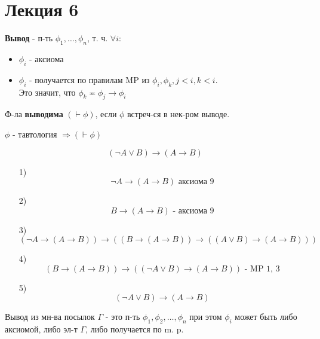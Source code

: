 \section{Лекция 6}
\begin{definition}
\textbf{Вывод} - п-ть $\phi_1, \ldots, \phi_n$, т. ч. $\forall i\colon$
\begin{itemize}
  \item $\phi_i$ - аксиома
  \item $\phi_i$ - получается по правилам MP из $\phi_i, \phi_k, j < i, k < i$. \\
    Это значит, что $\phi_k \eqcirc \phi_j \rightarrow \phi_i$
\end{itemize}
Ф-ла \textbf{выводима} $(\vdash \phi)$, если $\phi$ встреч-ся в нек-ром выводе.
\end{definition}
\begin{theorem}
$\phi$ - тавтология $ \Rightarrow (\vdash \phi)$ 
\end{theorem}
\begin{example}
\[
  (\neg A \lor B) \rightarrow (A \rightarrow B)
\]
\begin{itemize}
  \item [1)] \[
  \neg A \rightarrow (A \rightarrow B) \text{ аксиома 9}
  \]
\item [2) ] \[
  B \rightarrow (A \rightarrow B) \text{ - аксиома 9}
\]
\item [3) ] \[
  (\neg A \rightarrow (A \rightarrow B)) \rightarrow ((B \rightarrow (A \rightarrow B)) \rightarrow ((A \lor B) \rightarrow (A \rightarrow B)))
\]
\item [4) ] \[
  (B \rightarrow (A \rightarrow B)) \rightarrow ((\neg A \lor B) \rightarrow (A \rightarrow B)) \text{ - MP 1, 3}
\]
\item [5) ] \[
  (\neg A \lor B) \rightarrow (A \rightarrow B)
\]
\end{itemize}
\end{example}
\begin{definition}
Вывод из мн-ва посылок $\Gamma$ - это п-ть $\phi_1, \phi_2, \ldots, \phi_n$ при этом $\phi_i$ может быть либо аксиомой, либо эл-т $\Gamma$, либо получается по m. p.
\end{definition}

